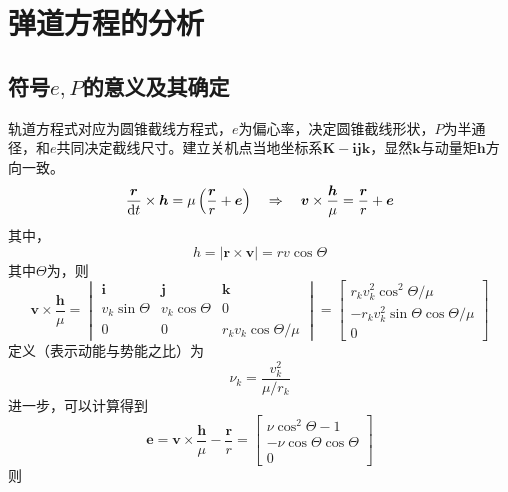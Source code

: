 \section{弹道方程的分析}
\subsection{符号$e,P$的意义及其确定}
轨道方程式对应为圆锥截线方程式，$e$为偏心率，决定圆锥截线形状，$P$为半通径，和$e$共同决定截线尺寸。建立关机点当地坐标系$\bm{K-ijk}$，显然$\bm{k}$与动量矩$\bm{h}$方向一致。
\begin{equation}
	\dfrac{\bm{r}}{{\rm{d}} t} \times \bm{h} = \mu \left(\dfrac{\bm{r}}{r} + \bm{e}\right) \quad \Rightarrow \quad \bm{v} \times \dfrac{\bm{h}}{\mu} = \dfrac{\bm{r}}{r} + \bm{e}
\end{equation}
其中，
\begin{equation}
	h = \left|\bm{r} \times \bm{v}\right| = rv \cos \varTheta
	\label{h}
\end{equation}
其中$\varTheta$为，则
\begin{equation}
	\bm{v} \times \dfrac{\bm{h}}{\mu} = 
	\begin{vmatrix}
		\bm{i} & \bm{j} & \bm{k}\\
		v_k\sin \varTheta & v_k \cos \varTheta & 0 \\
		0 & 0 & r_kv_k\cos \varTheta/\mu
	\end{vmatrix}
	= 
	\begin{bmatrix}
		r_kv_k^2 \cos^2 \varTheta / \mu \\
		-r_kv_k^2 \sin \varTheta \cos \varTheta / \mu \\
		0
	\end{bmatrix}
\end{equation}
定义（表示动能与势能之比）为
\begin{equation}
	\nu_k = \dfrac{v_k^2}{\mu / r_k}
\end{equation}
进一步，可以计算得到
\begin{equation}
	\bm{e} = \bm{v} \times \dfrac{\bm{h}}{\mu} - \dfrac{\bm{r}}{r} = 
	\begin{bmatrix}
		\nu \cos^2 \varTheta - 1\\
		-\nu \cos \varTheta \cos \varTheta\\
		0
	\end{bmatrix}
\end{equation}
则

